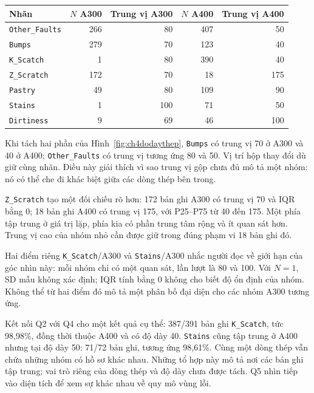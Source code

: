 \documentclass[12pt,a4paper,oneside]{report}
\newcommand{\maCot}[1]{{\urlstyle{tt}\def\UrlBreaks{\do\_\do\/\do\.}\def\UrlBigBreaks{}\nolinkurl{#1}}}
\begin{document}
\begin{center}\begin{minipage}{\linewidth}
\label{tab:ch4dodaythep}
\small{}
\begin{tabularx}{\linewidth}{@{}Y rrrr@{}}
\toprule
Nhãn & $N$ A300 & Trung vị A300 & $N$ A400 & Trung vị A400 \\
\midrule
\maCot{Other_Faults} & 266 & 80 & 407 & 50 \\
\maCot{Bumps} & 279 & 70 & 123 & 40 \\
\maCot{K_Scatch} & 1 & 80 & 390 & 40 \\
\maCot{Z_Scratch} & 172 & 70 & 18 & 175 \\
\maCot{Pastry} & 49 & 80 & 109 & 90 \\
\maCot{Stains} & 1 & 100 & 71 & 50 \\
\maCot{Dirtiness} & 9 & 69 & 46 & 100 \\
\bottomrule
\end{tabularx}
\end{minipage}\end{center}

Khi tách hai phần của Hình~\ref{fig:ch4dodaythep}, \maCot{Bumps} có trung vị 70 ở A300 và 40 ở A400; \maCot{Other_Faults} có trung vị tương ứng 80 và 50. Vị trí hộp thay đổi dù giữ cùng nhãn. Điều này giải thích vì sao trung vị gộp chưa đủ mô tả một nhóm: nó có thể che đi khác biệt giữa các dòng thép bên trong.

\maCot{Z_Scratch} tạo một đối chiếu rõ hơn: 172 bản ghi A300 có trung vị 70 và IQR bằng 0; 18 bản ghi A400 có trung vị 175, với P25--P75 từ 40 đến 175. Một phía tập trung ở giá trị lặp, phía kia có phần trung tâm rộng và ít quan sát hơn. Trung vị cao của nhóm nhỏ cần được giữ trong đúng phạm vi 18 bản ghi đó.

Hai điểm riêng \maCot{K_Scatch}/A300 và \maCot{Stains}/A300 nhắc người đọc về giới hạn của góc nhìn này: mỗi nhóm chỉ có một quan sát, lần lượt là 80 và 100. Với $N=1$, SD mẫu không xác định; IQR tính bằng 0 không cho biết độ ổn định của nhóm. Không thể từ hai điểm đó mô tả một phân bố đại diện cho các nhóm A300 tương ứng.

Kết nối Q2 với Q4 cho một kết quả cụ thể: 387/391 bản ghi \maCot{K_Scatch}, tức 98,98\%, đồng thời thuộc A400 và có độ dày 40. \maCot{Stains} cũng tập trung ở A400 nhưng tại độ dày 50: 71/72 bản ghi, tương ứng 98,61\%. Cùng một dòng thép vẫn chứa những nhóm có hồ sơ khác nhau. Những tổ hợp này mô tả nơi các bản ghi tập trung; vai trò riêng của dòng thép và độ dày chưa được tách. Q5 nhìn tiếp vào diện tích để xem sự khác nhau về quy mô vùng lỗi.
\end{document}
